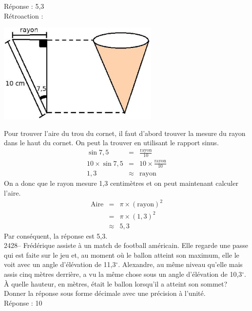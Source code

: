 \documentclass[letterpaper, 12pt]{article}
\begin{document}
R\'eponse : 5,3\\

R\'etroaction :\\
\begin{center}
 \includegraphics[width=8cm,bb=14 14 605 363]{Q2426.eps}
\end{center}
Pour trouver l'aire du trou du cornet, il faut d'abord trouver la mesure du rayon dans le haut du cornet. On peut la trouver en utilisant le rapport sinus.
\begin{eqnarray*}
 \sin{7,5}&=&\frac{\textrm{rayon}}{10}\\[2mm]
 10\times \sin{7,5}&=&10\times \frac{\textrm{rayon}}{10}\\[2mm]
 1,3&\approx&\textrm{rayon}
\end{eqnarray*}
On a donc que le rayon mesure 1,3 centim\`etres et on peut maintenant calculer l'aire.
\begin{eqnarray*}
 \textrm{Aire}&=& \pi \times (\textrm{rayon})^{2} \\
&=& \pi \times (1,3)^{2} \\
&\approx& 5,3
\end{eqnarray*}
Par cons\'equent, la r\'eponse est 5,3.\\

2428-- Fr\'ed\'erique assiste \`a un match de football am\'ericain. Elle regarde une passe qui est faite sur le jeu et, au moment o\`u le ballon atteint son maximum, elle le voit avec un angle d'\'el\'evation de 11,3$^{\circ}$. Alexandre, au m\^eme niveau qu'elle mais assis cinq m\`etres derri\`ere, a vu la m\^eme chose sous un angle d'\'el\'evation de 10,3$^{\circ}$. \`A quelle hauteur, en m\`etres, \'etait le ballon lorsqu'il a atteint son sommet?\\
Donner la r\'eponse sous forme d\'ecimale avec une pr\'ecision \`a l'unit\'e.\\

R\'eponse : 10\\
\end{document}
